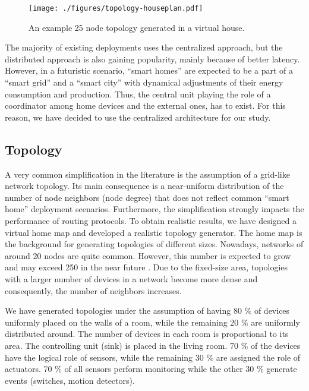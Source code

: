 \documentclass[conference,10pt,a4paper]{IEEEtran}
\begin{document}
\begin{figure}[htbp]
\centering
\texttt{[image: ./figures/topology-houseplan.pdf]}
\caption{An example 25 node topology generated in a virtual house. }
\label{houseplan-25nodes}
\end{figure}

The majority of existing deployments uses the centralized approach, but the
distributed approach is also gaining popularity, mainly because of better
latency. However, in a futuristic scenario, ``smart homes'' are expected to be
a part of a ``smart grid'' and a ``smart city'' with dynamical adjustments of
their energy consumption and production. Thus, the central unit playing the role
of a coordinator among home devices and the external ones, has to exist. For
this reason, we have decided to use the centralized architecture for our
study.
 

\vspace{-0.2cm}\subsection{Topology}
\label{topology}
A very common simplification in the literature is the assumption of a grid-like
network topology. 
Its main consequence is a near-uniform distribution of the number of node
neighbors (node degree) that does not reflect common ``smart home'' deployment
scenarios. Furthermore, the simplification strongly impacts the performance of
routing protocols. To obtain realistic results, we have designed a virtual
 home map and developed a realistic topology generator. 
The home map is the background for generating topologies of different
sizes. Nowadays, networks of around 20 nodes are quite common. 
However, this number is expected to grow and may exceed 250 in the near future
\cite{routingreq-home}. Due to the fixed-size area, topologies with a larger
number of devices in a network become more dense and consequently, the number of
neighbors increases. 

We have generated topologies under the assumption of having 80 \% of devices
uniformly placed on the walls of a room, while the remaining 20 \% are uniformly
distributed around. The number of devices in each room is proportional to its
area. The controlling unit (sink) is placed in the living room. 70 \% of the
devices have the logical role of sensors, while the remaining 30 \% are
assigned the role of actuators. 70 \% of all sensors perform monitoring while the other 30 \%
generate events (switches, motion detectors).
\end{document}
